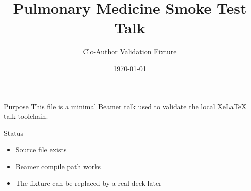 \documentclass{beamer}
\title{Pulmonary Medicine Smoke Test Talk}
\author{Clo-Author Validation Fixture}
\date{\today}
\begin{document}
\begin{frame}
  \titlepage
\end{frame}

\begin{frame}{Purpose}
This file is a minimal Beamer talk used to validate the local XeLaTeX talk toolchain.
\end{frame}

\begin{frame}{Status}
\begin{itemize}
  \item Source file exists
  \item Beamer compile path works
  \item The fixture can be replaced by a real deck later
\end{itemize}
\end{frame}
\end{document}
